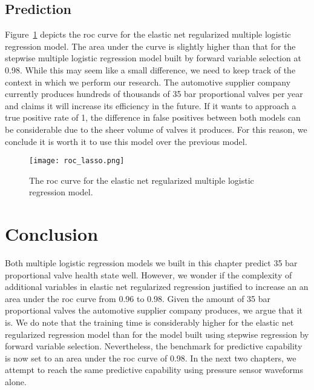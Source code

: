 \subsection{Prediction}

Figure~\ref{fig:roc-elastic} depicts the \acrshort{roc} curve for the elastic net regularized multiple logistic regression model.
The area under the curve is slightly higher than that for the stepwise multiple logistic regression model built by forward variable selection at 0.98.
While this may seem like a small difference, we need to keep track of the context in which we perform our research.
The automotive supplier company currently produces hundreds of thousands of 35 bar proportional valves per year and claims it will increase its efficiency in the future.
If it wants to approach a true positive rate of 1, the difference in false positives between both models can be considerable due to the sheer volume of valves it produces.
For this reason, we conclude it is worth it to use this model over the previous model.

\begin{figure}
  \texttt{[image: roc\_lasso.png]}
  \caption{The \acrshort{roc} curve for the elastic net regularized multiple logistic regression model.}
  \label{fig:roc-elastic}
\end{figure}

\section{Conclusion}

Both multiple logistic regression models we built in this chapter predict 35 bar proportional valve health state well.
However, we wonder if the complexity of additional variables in elastic net regularized regression justified to increase an an area under the \acrshort{roc} curve from 0.96 to 0.98.
Given the amount of 35 bar proportional valves the automotive supplier company produces, we argue that it is.
We do note that the training time is considerably higher for the elastic net regularized regression model than for the model built using stepwise regression by forward variable selection.
Nevertheless, the benchmark for predictive capability is now set to an area under the \acrshort{roc} curve of 0.98.
In the next two chapters, we attempt to reach the same predictive capability using pressure sensor waveforms alone.
